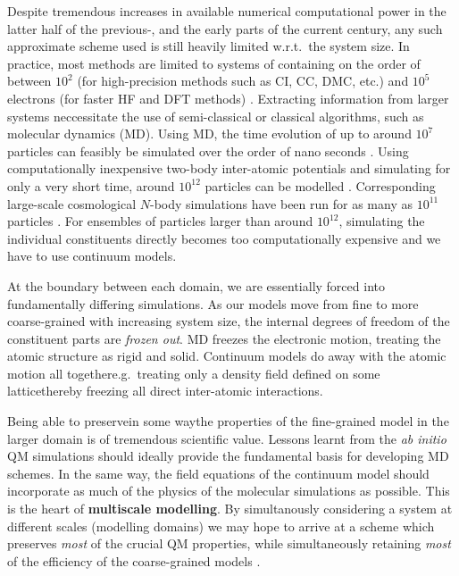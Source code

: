 \documentclass[twoside,english]{uiofysmaster}
\begin{document}
Despite tremendous increases in available numerical computational power in the latter half of the previous-, and the early parts of the current century, any such approximate scheme used is still heavily limited w.r.t.\ the system size. In practice, most methods are limited to systems of containing on the order of between $10^2$ (for high-precision methods such as CI, CC, DMC, etc.) and $10^5$ electrons (for faster HF and DFT methods) \cite{hu,bowler,vandevondele}. Extracting information from larger systems neccessitate the use of semi-classical or classical algorithms, such as molecular dynamics (MD). Using MD, the time evolution of up to around $10^7$ particles can feasibly be simulated over the order of nano seconds \cite{Zhao2013,Reddy}. Using computationally inexpensive two-body inter-atomic potentials and simulating for only a very short time, around $10^{12}$ particles can be modelled \cite{trillion}. Corresponding large-scale cosmological $N$-body simulations have been run for as many as $10^{11}$ particles \cite{angulo,kim}. For ensembles of particles larger than around $10^{12}$, simulating the individual constituents directly becomes too computationally expensive and we have to use continuum models.

At the boundary between each domain, we are essentially forced into fundamentally differing simulations. As our models move from fine to more coarse-grained with increasing system size, the internal degrees of freedom of the constituent parts are \emph{frozen out}. MD freezes the electronic motion, treating the atomic structure as rigid and solid. Continuum models do away with the atomic motion all together\textemdash e.g.\ treating only a density field defined on some lattice\textemdash thereby freezing all direct inter-atomic interactions.

Being able to preserve\textemdash in some way\textemdash the properties of the fine-grained model in the larger domain is of tremendous scientific value. Lessons learnt from the \emph{ab initio} QM simulations should ideally provide the fundamental basis for developing MD schemes. In the same way, the field equations of the continuum model should incorporate as much of the physics of the molecular simulations as possible. This is the heart of {\bf multiscale modelling}. By simultanously considering a system at different scales (modelling domains) we may hope to arrive at a scheme which preserves \emph{most} of the crucial QM properties, while simultaneously retaining \emph{most} of the efficiency of the coarse-grained models \cite{weinan}.
\end{document}
